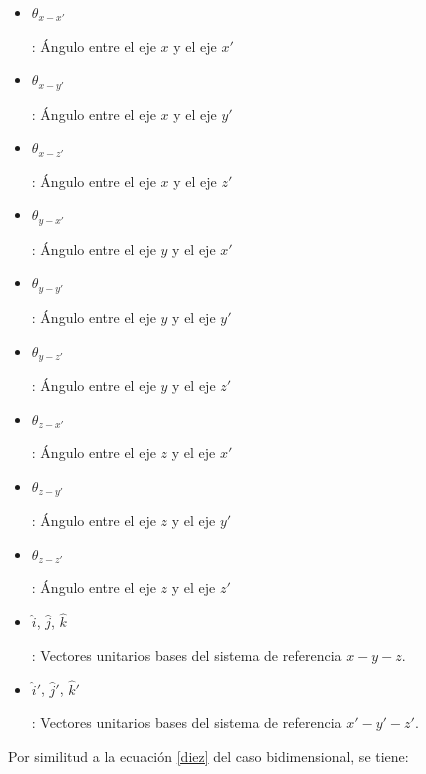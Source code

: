 \documentclass[12pt,letterpaper, twoside, openany]{article}
\begin{document}
%
\begin{itemize}
	\item \begin{large}$\theta_{x-x'}$\end{large}: Ángulo entre el eje $x$ y el eje $x'$
	\item \begin{large}$\theta_{x-y'}$\end{large}: Ángulo entre el eje $x$ y el eje $y'$
	\item \begin{large}$\theta_{x-z'}$\end{large}: Ángulo entre el eje $x$ y el eje $z'$
	\item \begin{large}$\theta_{y-x'}$\end{large}: Ángulo entre el eje $y$ y el eje $x'$
	\item \begin{large}$\theta_{y-y'}$\end{large}: Ángulo entre el eje $y$ y el eje $y'$
	\item \begin{large}$\theta_{y-z'}$\end{large}: Ángulo entre el eje $y$ y el eje $z'$
	\item \begin{large}$\theta_{z-x'}$\end{large}: Ángulo entre el eje $z$ y el eje $x'$
	\item \begin{large}$\theta_{z-y'}$\end{large}: Ángulo entre el eje $z$ y el eje $y'$
	\item \begin{large}$\theta_{z-z'}$\end{large}: Ángulo entre el eje $z$ y el eje $z'$
	\item \begin{large}$\hat{i}$, $\hat{j}$, $\hat{k}$\end{large}: Vectores unitarios bases del sistema de referencia $x-y-z$.
	\item \begin{large}$\hat{i}'$, $\hat{j}'$, $\hat{k}'$\end{large}: Vectores unitarios bases del sistema de referencia $x'-y'-z'$.
\end{itemize}
%
Por similitud a la ecuación \ref{diez} del caso bidimensional, se tiene: 
%
\end{document}
